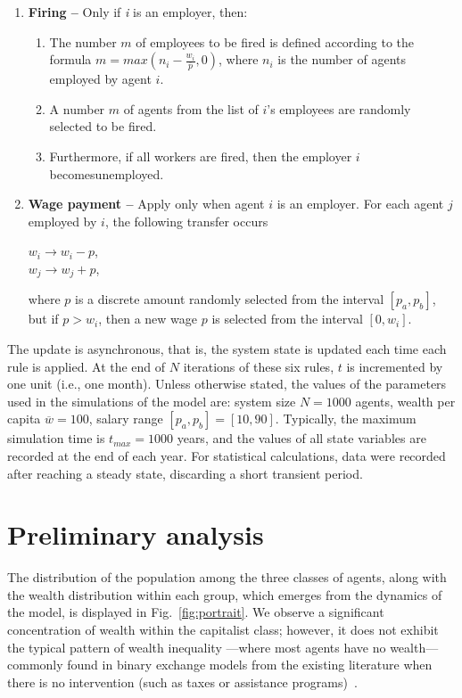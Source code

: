 \documentclass[11pt,a4paper]{revtex4-1}
\begin{document}
\begin{enumerate}[leftmargin=*]
\item {\bf Firing --} Only if \textit{i} is an employer, then:
 
\begin{enumerate}[leftmargin=*]
    \item The number $m$ of employees to be fired is defined according to the  formula 
$ m=max(n_{i}-\frac{w_{i}}{\overline{p}},0)$, 
where $n_i$ is the number of agents employed by agent $i$. 
 
    
\item A number $m$ of agents from the list of $i$'s employees are randomly selected to be fired.

\item
Furthermore, if all workers are fired, then the employer $i$ becomesunemployed.


\end{enumerate}
\item 
{\bf Wage payment --} Apply only when agent $i$ is an employer. 
For each agent $j$ employed by $i$, the following transfer occurs  
\begin{center}  
  $w_i  \to w_i-p$,  \\
  $w_j  \to w_j+p$,
\end{center}
where $p$ is a discrete amount randomly selected from the interval $[p_a,p_b]$, but if $p > w_i$, then a new wage $p$ is selected from the interval $[0,w_i]$.
  


\end{enumerate}

The update is asynchronous, that is, the system state is updated each time each rule is applied. 
At the end of $N$ iterations of these six rules, $t$ is incremented by one unit (i.e., one month). 
%
Unless otherwise stated, the values of the parameters used in the simulations of the model are: system size $N = 1000$ agents, wealth per capita $\overline{w} = 100$, salary range $[p_a,p_b]=[10,90]$. Typically, the maximum simulation time is $t_{max}=1000$ years, and the values of all state variables are recorded at the end of each year. 
For statistical calculations, data were recorded after reaching a steady state, discarding a short transient period. 



\section{Preliminary  analysis}
%

%
The distribution of the population among the three classes of agents, along with the wealth distribution within each group, which emerges from the dynamics of the model, is displayed in Fig.~\ref{fig:portrait}. 
We observe a significant concentration of wealth within the capitalist class; however, it does not exhibit the typical pattern of wealth inequality ---where most agents have no wealth--- commonly found in binary exchange models from the existing literature when there is no intervention (such as taxes or assistance programs)~\cite{moukarzel2007,boghosian2014,CARDOSO2020,LIMA2022}.
\end{document}
